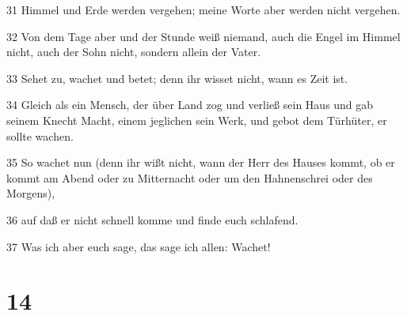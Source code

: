 \par 31 Himmel und Erde werden vergehen; meine Worte aber werden nicht vergehen.
\par 32 Von dem Tage aber und der Stunde weiß niemand, auch die Engel im Himmel nicht, auch der Sohn nicht, sondern allein der Vater.
\par 33 Sehet zu, wachet und betet; denn ihr wisset nicht, wann es Zeit ist.
\par 34 Gleich als ein Mensch, der über Land zog und verließ sein Haus und gab seinem Knecht Macht, einem jeglichen sein Werk, und gebot dem Türhüter, er sollte wachen.
\par 35 So wachet nun (denn ihr wißt nicht, wann der Herr des Hauses kommt, ob er kommt am Abend oder zu Mitternacht oder um den Hahnenschrei oder des Morgens),
\par 36 auf daß er nicht schnell komme und finde euch schlafend.
\par 37 Was ich aber euch sage, das sage ich allen: Wachet!

\chapter{14}

